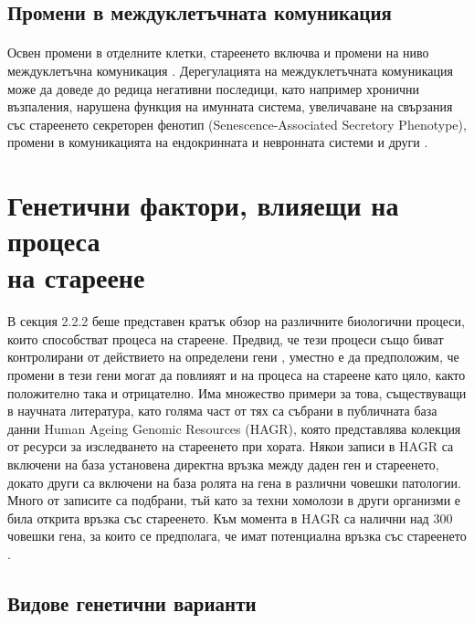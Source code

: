 \documentclass[pdftex,cyrillic,14pt,a4page,twoside,openright]{extreport}
\begin{document}
\subsection{Промени в междуклетъчната комуникация}
\paragraph{}
Освен промени в отделните клетки, стареенето включва и промени на ниво междуклетъчна комуникация \cite{lopezotin2013}. Дерегулацията на междуклетъчната комуникация може да доведе до редица негативни последици, като например хронични възпаления, нарушена функция на имунната система, увеличаване на свързания със стареенето секреторен фенотип (Senescence-Associated Secretory Phenotype), промени в комуникацията на ендокринната и невронната системи и други \cite{lagger2021}.

\section[Генетични фактори, влияещи на процеса на стареене]{Генетични фактори, влияещи на процеса\\ на стареене}
\paragraph{}
В секция 2.2.2 беше представен кратък обзор на различните биологични процеси, които способстват процеса на стареене. Предвид, че тези процеси също биват контролирани от действието на определени гени \cite{liu2004, jin2018, tominaga2002}, уместно е да предположим, че промени в тези гени могат да повлияят и на процеса на стареене като цяло, както положително така и отрицателно. Има множество примери за това, съществуващи в научната литература, като голяма част от тях са събрани в публичната база данни Human Ageing Genomic Resources (HAGR), която представлява колекция от ресурси за изследването на стареенето при хората. Някои записи в HAGR са включени на база установена директна връзка между даден ген и стареенето, докато други са включени на база ролята на гена в различни човешки патологии. Много от записите са подбрани, тъй като за техни хомолози в други организми е била открита връзка със стареенето. Към момента в HAGR са налични над 300 човешки гена, за които се предполага, че имат потенциална връзка със стареенето \cite{tacutu2018}.

\subsection[Видове генетични варианти]{Видове генетични варианти}
\end{document}
